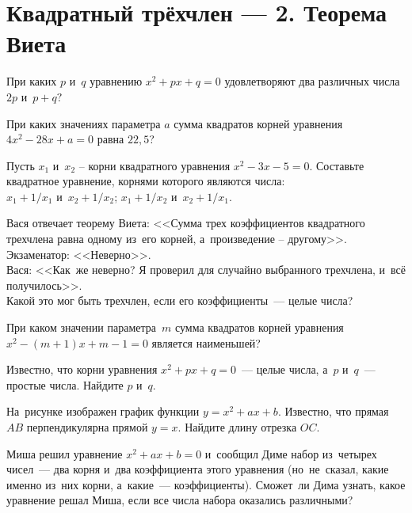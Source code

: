 
\section*{Квадратный трёхчлен --- 2. Теорема Виета}


\begin{problems}

\item
При каких $p$ и~$q$ уравнению $x^2 + px + q = 0$ удовлетворяют два различных
числа $2p$ и~$p + q?$

\item
При каких значениях параметра $a$ сумма квадратов корней уравнения
$4 x^2 - 28 x + a = 0$ равна $22{,}5$?

\item
Пусть $x_1$ и~$x_2$ -- корни квадратного уравнения $x^2 - 3 x - 5 = 0$.
Составьте квадратное уравнение, корнями которого являются числа:
\\
\subproblem
$x_1 + 1 / x_1$ и~$x_2 + 1 / x_2$;
\qquad
\subproblem
$x_1 + 1 / x_2$ и~$x_2 + 1 / x_1$.

\item
Вася отвечает теорему Виета:
<<Сумма трех коэффициентов квадратного трехчлена
равна одному из~его корней, а~произведение -- другому>>.
\\
Экзаменатор: <<Неверно>>.
\\
Вася:
<<Как~же неверно?
Я проверил для случайно выбранного трехчлена, и~всё получилось>>.
\\
Какой это мог быть трехчлен, если его коэффициенты~--- целые числа?

\item
При каком значении параметра~$m$ сумма квадратов корней уравнения\enspace
$x^2 - (m + 1) x + m - 1 = 0$%
\enspace
является наименьшей?

\item
Известно, что корни уравнения $x^2 + px + q = 0$~--- целые числа,
а~$p$ и~$q$~--- простые числа.
Найдите $p$ и~$q$.

\item
На~рисунке изображен график функции $y = x^2 + ax + b$.
Известно, что прямая~$AB$ перпендикулярна прямой $y = x$.
Найдите длину отрезка $OC$.
\begin{center}
\end{center}

\item
Миша решил уравнение $x^2 + a x + b = 0$ и~сообщил Диме набор из~четырех
чисел~--- два корня и~два коэффициента этого уравнения
(но~не~сказал, какие именно из~них корни, а~какие~--- коэффициенты).
Сможет~ли Дима узнать, какое уравнение решал Миша, если все числа набора
оказались различными?

\end{problems}

